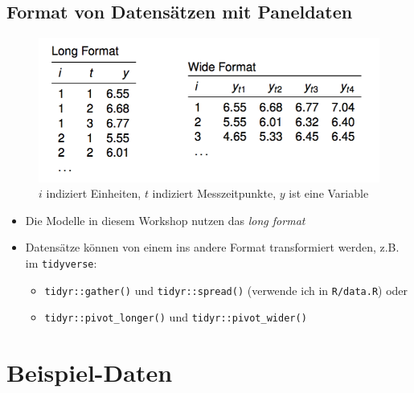 \documentclass[]{book}
\providecommand{\tightlist}{%
  \setlength{\itemsep}{0pt}\setlength{\parskip}{0pt}}
\begin{document}
\hypertarget{format-von-datensuxe4tzen-mit-paneldaten}{%
\subsection*{Format von Datensätzen mit Paneldaten}\label{format-von-datensuxe4tzen-mit-paneldaten}}

\begin{figure}
\centering
\includegraphics{figs/longwide.png}
\caption{\(i\) indiziert Einheiten, \(t\) indiziert Messzeitpunkte, \(y\) ist eine Variable}
\end{figure}

\begin{itemize}
\item
  Die Modelle in diesem Workshop nutzen das \emph{long format}
\item
  Datensätze können von einem ins andere Format transformiert werden, z.B. im \texttt{tidyverse}:

  \begin{itemize}
  \tightlist
  \item
    \texttt{tidyr::gather()} und \texttt{tidyr::spread()} (verwende ich in \texttt{R/data.R}) oder
  \item
    \texttt{tidyr::pivot\_longer()} und \texttt{tidyr::pivot\_wider()}
  \end{itemize}
\end{itemize}

\hypertarget{beispiel-daten}{%
\section{Beispiel-Daten}\label{beispiel-daten}}
\end{document}
